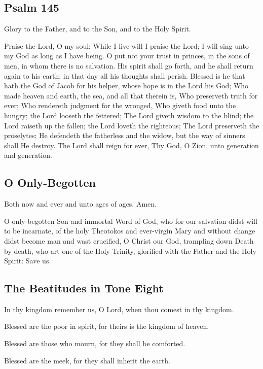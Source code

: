 \subsection{Psalm 145}

 Glory to the Father, and to the Son, and to the Holy Spirit.

Praise the Lord, O my soul; While I live will I praise the Lord; I will sing unto my God as long as I have being. O put not your trust in princes, in the sons of men, in whom there is no salvation. His spirit shall go forth, and he shall return again to his earth; in that day all his thoughts shall perish. Blessed is he that hath the God of Jacob for his helper, whose hope is in the Lord his God; Who made heaven and earth, the sea, and all that therein is, Who preserveth truth for ever; Who rendereth judgment for the wronged, Who giveth food unto the hungry; the Lord looseth the fettered; The Lord giveth wisdom to the blind; the Lord raiseth up the fallen; the Lord loveth the righteous; The Lord preserveth the proselytes; He defendeth the fatherless and the widow, but the way of sinners shall He destroy. The Lord shall reign for ever, Thy God, O Zion, unto generation and generation.

\subsection{O Only-Begotten}

Both now and ever and unto ages of ages. Amen.

O only-begotten Son and immortal Word of God, who for our salvation didst will to be incarnate, of the holy Theotokos and ever-virgin Mary and without change didst become man and wast crucified, O Christ our God, trampling down Death by death, who art one of the Holy Trinity, glorified with the Father and the Holy Spirit: Save us.

\subsection{The Beatitudes in Tone Eight}

In thy kingdom remember us, O Lord, when thou comest in thy kingdom.

Blessed are the poor in spirit, for theirs is the kingdom of heaven.

Blessed are those who mourn, for they shall be comforted.

Blessed are the meek, for they shall inherit the earth.

